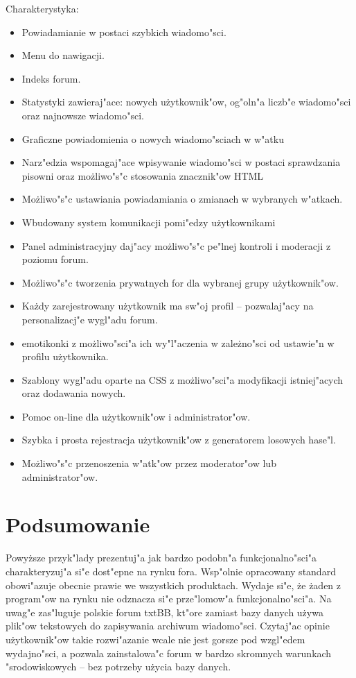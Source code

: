 \documentclass[12pt,a4paper,twoside]{article}
\begin{document}
Charakterystyka:
\begin{itemize}
\item		Powiadamianie w postaci szybkich wiadomo"sci.
\item		Menu do nawigacji.
\item		Indeks forum.
\item		Statystyki zawieraj"ace: nowych u\.zytkownik"ow, og"oln"a liczb"e wiadomo"sci oraz najnowsze wiadomo"sci.
\item		Graficzne powiadomienia o nowych wiadomo"sciach w w"atku
\item		Narz"edzia wspomagaj"ace wpisywanie wiadomo"sci w postaci sprawdzania pisowni oraz mo\.zliwo"s"c stosowania znacznik"ow HTML
\item		Mo\.zliwo"s"c ustawiania powiadamiania o zmianach w wybranych w"atkach.
\item		Wbudowany system komunikacji pomi"edzy u\.zytkownikami
\item		Panel administracyjny daj"acy mo\.zliwo"s"c pe"lnej kontroli i moderacji z poziomu forum.
\item		Mo\.zliwo"s"c tworzenia prywatnych for dla wybranej grupy u\.zytkownik"ow.
\item		Ka\.zdy zarejestrowany u\.zytkownik ma sw"oj profil -- pozwalaj"acy na personalizacj"e wygl"adu forum.
\item		emotikonki z mo\.zliwo"sci"a ich wy"l"aczenia w zale\.zno"sci od ustawie"n w profilu u\.zytkownika.
\item		Szablony wygl"adu oparte na CSS z mo\.zliwo"sci"a modyfikacji istniej"acych oraz dodawania nowych.
\item		Pomoc on-line dla u\.zytkownik"ow i administrator"ow.
\item		Szybka i prosta rejestracja u\.zytkownik"ow z generatorem losowych hase"l.
\item		Mo\.zliwo"s"c przenoszenia w"atk"ow przez moderator"ow lub administrator"ow.
\end{itemize}		

\newpage		
\section{Podsumowanie}
Powy\.zsze przyk"lady prezentuj"a jak bardzo podobn"a funkcjonalno"sci"a charakteryzuj"a si"e dost"epne na rynku fora. Wsp"olnie opracowany standard obowi"azuje obecnie prawie we wszystkich produktach. Wydaje si"e, \.ze \.zaden z program"ow  na rynku nie odznacza si"e prze"lomow"a funkcjonalno"sci"a. Na uwag"e zas"luguje polskie forum txtBB, kt"ore zamiast bazy danych u\.zywa plik"ow tekstowych do zapisywania archiwum wiadomo"sci. Czytaj"ac opinie u\.zytkownik"ow takie rozwi"azanie wcale nie jest gorsze pod wzgl"edem wydajno"sci, a pozwala zainstalowa"c forum w bardzo skromnych warunkach "srodowiskowych -- bez potrzeby u\.zycia bazy danych.
\end{document}
